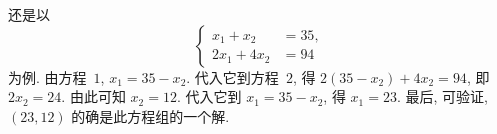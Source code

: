 \documentclass[../libro.tex]{subfiles}
\begin{document}
还是以
\begin{equation*}
    \left\{ %
    \begin{aligned}
        x_1 + x_2   & = 35, \\
        2x_1 + 4x_2 & = 94
    \end{aligned}
    \right. %
\end{equation*}
为例.
由方程~\(1\), \(x_1 = 35 - x_2\).
代入它到方程~\(2\), 得
\(2(35 - x_2) + 4x_2 = 94\),
即 \(2x_2 = 24\).
由此可知 \(x_2 = 12\).
代入它到 \(x_1 = 35 - x_2\),
得 \(x_1 = 23\).
最后, 可验证, \((23, 12)\) 的确是此方程组的一个解.
\end{document}
